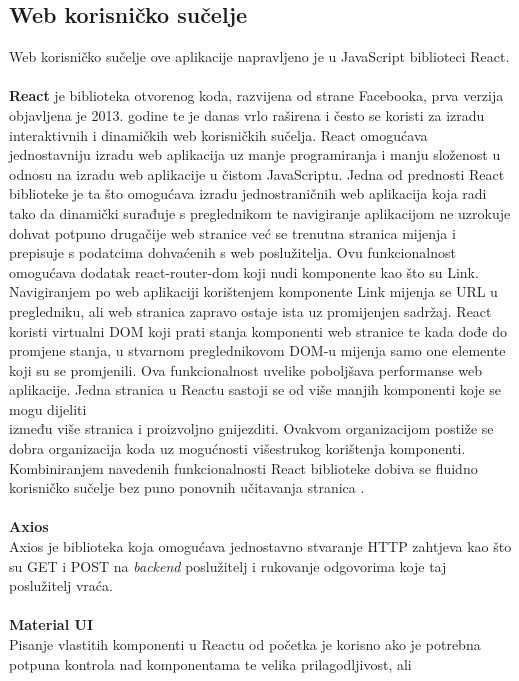 \documentclass[times, utf8, zavrsni]{fer}
\begin{document}
\subsection{Web korisničko sučelje}
Web korisničko sučelje ove aplikacije napravljeno je u JavaScript biblioteci React. 
\\
\\ \textbf{React} je biblioteka otvorenog koda, razvijena od strane Facebooka,
prva verzija \\objavljena je 2013. godine te je danas vrlo raširena i često se koristi za izradu interaktivnih i dinamičkih web korisničkih sučelja. 
React omogućava jednostavniju izradu web aplikacija uz manje programiranja i manju složenost u odnosu na izradu web aplikacije u čistom JavaScriptu.
Jedna od prednosti React biblioteke je ta što omogućava izradu jednostraničnih web aplikacija  koja radi tako 
da dinamički surađuje s preglednikom te navigiranje aplikacijom ne uzrokuje dohvat potpuno drugačije web stranice već se trenutna stranica 
mijenja i prepisuje s podatcima dohvaćenih s web poslužitelja. Ovu funkcionalnost omogućava dodatak react-router-dom koji nudi komponente kao što su Link.
Navigiranjem po web aplikaciji korištenjem komponente Link mijenja se URL u pregledniku, ali web stranica zapravo ostaje ista uz promijenjen sadržaj.
React koristi virtualni DOM  koji prati stanja 
komponenti web stranice te kada dođe do promjene stanja, u stvarnom preglednikovom DOM-u mijenja samo one elemente koji su se promjenili. Ova 
funkcionalnost uvelike poboljšava performanse web aplikacije.
Jedna stranica u Reactu sastoji se od više manjih komponenti koje se mogu dijeliti \\između više stranica i proizvoljno gnijezditi. Ovakvom organizacijom
postiže se dobra organizacija koda uz mogućnosti višestrukog korištenja komponenti.
Kombiniranjem navedenih funkcionalnosti React biblioteke dobiva se fluidno korisničko sučelje bez puno ponovnih učitavanja stranica .
\\
\\ \textbf{Axios}
\\ Axios je biblioteka koja omogućava jednostavno stvaranje HTTP zahtjeva kao što su GET i POST na \emph{backend} poslužitelj i rukovanje odgovorima koje taj poslužitelj vraća.
\\
\\ \textbf{Material UI}
\\ Pisanje vlastitih komponenti u Reactu od početka je korisno ako je potrebna potpuna kontrola nad komponentama te velika prilagodljivost, ali
\end{document}
